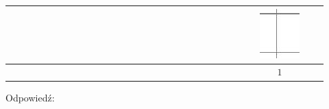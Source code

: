 \documentclass[10pt]{article}
\begin{document}
\begin{center}
\begin{tabular}{|c|c|c|c|c|c|c|c|c|c|c|c|c|c|c|c|c|c|c|c|c|c|c|c|c|c|c|c|c|}
 &  &  &  &  &  &  &  &  &  &  &  &  &  &  &  &  &  &  &  &  &  &  &  &  &  & \includegraphics[max width=\textwidth]{2024_11_21_997c30e0b98e62837d84g-15}
 &  &  \\
\hline
 &  &  &  &  &  &  &  &  &  &  &  &  &  &  &  &  &  &  &  &  &  &  &  &  &  & \( 1 \) &  &  \\
\hline
\end{tabular}
\end{center}

Odpowiedź:
\end{document}
